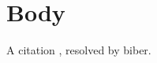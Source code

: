 \documentclass{article}
\begin{document}
\section{Body}
A citation \autocite{knuth1984}, resolved by biber.

\printbibliography
\end{document}
